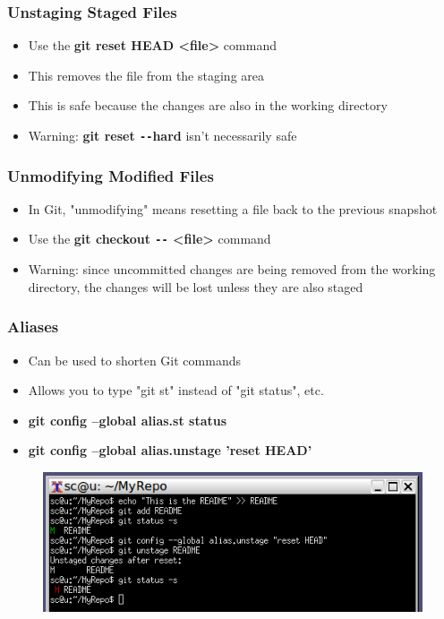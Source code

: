 \documentclass{beamer}
\begin{document}
\begin{frame}
	\frametitle{Unstaging Staged Files}
	\begin{itemize}
		\item{Use the \textbf{git reset HEAD \textless{}file\textgreater{}} command}
		\item{This removes the file from the staging area}
		\item{This is safe because the changes are also in the working directory}
		\item{Warning: \textbf{git reset \texttt{-{}-}hard} isn't necessarily safe}
	\end{itemize}
\end{frame}

\begin{frame}
	\frametitle{Unmodifying Modified Files}
	\begin{itemize}
		\item{In Git, "unmodifying" means resetting a file back to the previous snapshot}
		\item{Use the \textbf{git checkout \texttt{-{}-} \textless{}file\textgreater{}} command}
		\item{Warning: since uncommitted changes are being removed from the working directory, the changes will be lost unless they are also staged}
	\end{itemize}
\end{frame}

\begin{frame}
	\frametitle{Aliases}
	\begin{itemize}
		\item{Can be used to shorten Git commands}
		\item{Allows you to type "git st" instead of "git status", etc.}
		\item{\textbf{git config --global alias.st status}}
		\item{\textbf{git config --global alias.unstage 'reset HEAD'}}
	\end{itemize}
	\begin{figure}
		\includegraphics[scale=0.62]{Aliases-0.png}
	\end{figure}
\end{frame}
\end{document}
